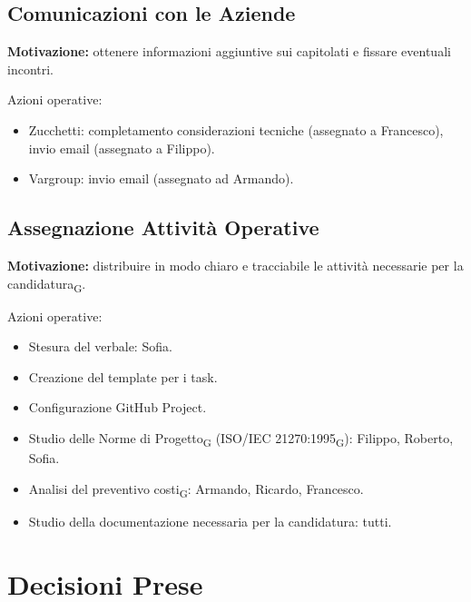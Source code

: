 \subsection{Comunicazioni con le Aziende}
\textbf{Motivazione:} ottenere informazioni aggiuntive sui capitolati e fissare eventuali incontri.

Azioni operative:
\begin{itemize}
    \item Zucchetti: completamento considerazioni tecniche (assegnato a Francesco), invio email (assegnato a Filippo).
    \item Vargroup: invio email (assegnato ad Armando).
\end{itemize}

\subsection{Assegnazione Attività Operative}
\textbf{Motivazione:} distribuire in modo chiaro e tracciabile le attività necessarie per la candidatura\textsubscript{G}.

Azioni operative:
\begin{itemize}
    \item Stesura del verbale: Sofia.
    \item Creazione del template per i task.
    \item Configurazione GitHub Project.
    \item Studio delle Norme di Progetto\textsubscript{G} (ISO/IEC 21270:1995\textsubscript{G}): Filippo, Roberto, Sofia.
    \item Analisi del preventivo costi\textsubscript{G}: Armando, Ricardo, Francesco.
    \item Studio della documentazione necessaria per la candidatura: tutti.
\end{itemize}

\section{Decisioni Prese}

